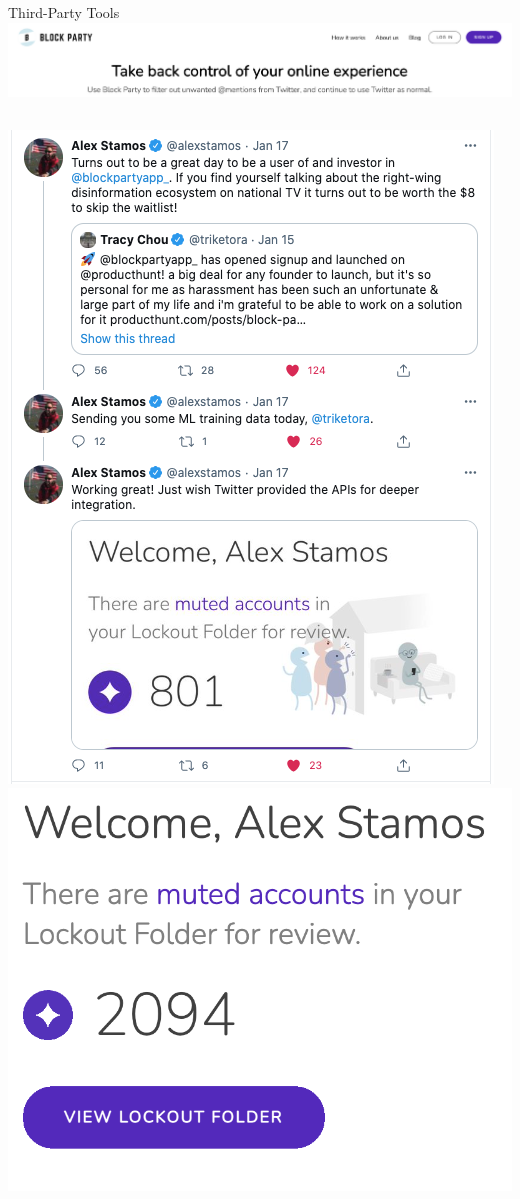 \documentclass[nobackground,dvipsnames,table]{beamer}
\begin{document}
\begin{frame}{Third-Party Tools}
    \includegraphics[width=\textwidth]{block-party}
    \begin{columns}[T]
            \includegraphics[width=\textwidth]{block-party-stamos-tweets}
            \includegraphics[width=\textwidth]{block-party-2}

\end{columns}
\end{frame}
\end{document}
